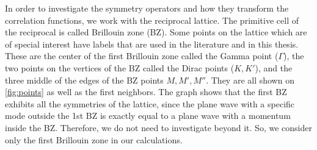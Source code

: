 In order to investigate the symmetry operators and how they transform the correlation functions, we work with the reciprocal lattice. The primitive cell of the reciprocal is called Brillouin zone (BZ). Some points on the lattice which are of special interest have labels that are used in the literature and in this thesis. These are the center of the first Brillouin zone called the Gamma point ($\Gamma$), the two points on the vertices of the BZ called the Dirac points ($K, K'$), and the three middle of the edges of the BZ points $M, M', M''$. They are all shown on \cref{fig:points} as well as the first neighbors. The graph shows that the first BZ exhibits all the symmetries of the lattice, since the plane wave with a specific mode outside the 1st BZ is exactly equal to a plane wave with a momentum inside the BZ. Therefore, we do not need to investigate beyond it. So, we consider only the first Brillouin zone in our calculations.
